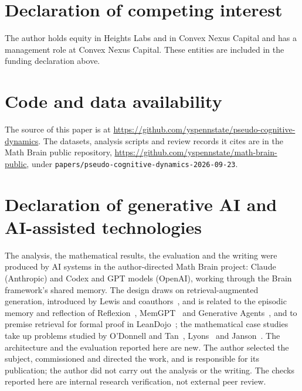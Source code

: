 \documentclass[11pt,letterpaper]{article}
\begin{document}
\section*{Declaration of competing interest}
The author holds equity in Heights Labs and in Convex Nexus Capital and has a management role at Convex Nexus Capital. These entities are included in the funding declaration above.

\section*{Code and data availability}
The source of this paper is at \url{https://github.com/yspennstate/pseudo-cognitive-dynamics}. The datasets, analysis scripts and review records it cites are in the Math Brain public repository, \url{https://github.com/yspennstate/math-brain-public}, under \texttt{papers/pseudo-cognitive-dynamics-2026-09-23}.

\section*{Declaration of generative AI and AI-assisted technologies}
The analysis, the mathematical results, the evaluation and the writing were produced by AI systems in the author-directed Math Brain project: Claude (Anthropic) and Codex and GPT models (OpenAI), working through the Brain framework's shared memory. The design draws on retrieval-augmented generation, introduced by Lewis and coauthors~\citep{rag2020}, and is related to the episodic memory and reflection of Reflexion~\citep{reflexion2023}, MemGPT~\citep{memgpt2023} and Generative Agents~\citep{generative2023}, and to premise retrieval for formal proof in LeanDojo~\citep{leandojo2023}; the mathematical case studies take up problems studied by O'Donnell and Tan~\citep{ODonnellTanFEI}, Lyons~\citep{Lyons2003} and Janson~\citep{Janson2012}. The architecture and the evaluation reported here are new. The author selected the subject, commissioned and directed the work, and is responsible for its publication; the author did not carry out the analysis or the writing. The checks reported here are internal research verification, not external peer review.

\appendix

\begingroup
\small\raggedright


\endgroup
\end{document}
